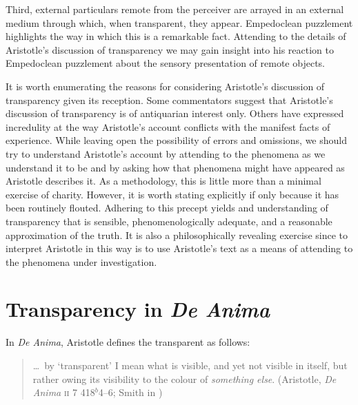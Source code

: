 Third, external particulars remote from the perceiver are arrayed in an external medium through which, when transparent, they appear. Empedoclean puzzlement highlights the way in which this is a remarkable fact. Attending to the details of Aristotle's discussion of transparency we may gain insight into his reaction to Empedoclean puzzlement about the sensory presentation of remote objects.

It is worth enumerating the reasons for considering Aristotle's discussion of transparency given its reception. Some commentators suggest that Aristotle's discussion of transparency is of antiquarian interest only. Others have expressed incredulity at the way Aristotle's account conflicts with the manifest facts of experience. While leaving open the possibility of errors and omissions, we should try to understand Aristotle's account by attending to the phenomena as we understand it to be and by asking how that phenomena might have appeared as Aristotle describes it. As a methodology, this is little more than a minimal exercise of charity. However, it is worth stating explicitly if only because it has been routinely flouted. Adhering to this precept yields and understanding of transparency that is sensible, phenomenologically adequate, and a reasonable approximation of the truth. It is also a philosophically revealing exercise since to interpret Aristotle in this way is to use Aristotle's text as a means of attending to the phenomena under investigation.


\section{Transparency in \emph{De Anima}} %
\label{sec:transparency_in_de_anima}

In \emph{De Anima}, Aristotle defines the transparent as follows:
\begin{quote}
	\ldots\ by `transparent' I mean what is visible, and yet not visible in itself, but rather owing its visibility to the colour of \emph{something else}. (Aristotle, \emph{De Anima} \textsc{ii} 7 418\( ^{b} \)4--6; Smith in \citealt[32]{Barnes:1984uq})
\end{quote}

